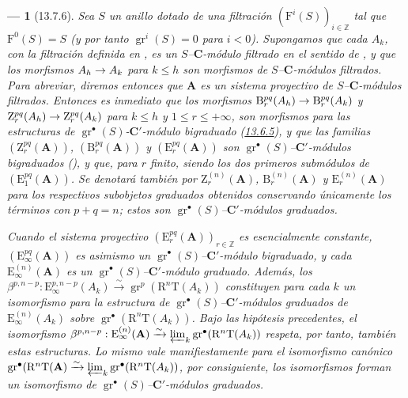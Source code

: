 \documentclass[10pt,oneside,openany]{book}
\theoremstyle{egaenv}\newtheorem*{env}{---}
\theoremstyle{egastatement}
\theoremstyle{egadescription}
\renewcommand{\leq}{\leqslant}
\renewcommand{\to}{\mathchoice{\longrightarrow}{\rightarrow}{\rightarrow}{\rightarrow}}
\begin{document}
\begin{env}[13.7.6]
\label{0.13.7.6}
\label{0.13.7.6-fr}
Sea $S$ un anillo dotado de una filtración
$(\mathrm F^i(S))_{i\in\mathbb Z}$ tal que
$\mathrm F^0(S)=S$ (y por tanto
$\operatorname{gr}^i(S)=0$ para $i<0$).
Supongamos que cada $A_k$, con la filtración definida en
, es un
$S$--$\boldsymbol{C}$-\emph{módulo filtrado} en el sentido de , y que los
morfismos $A_h\to A_k$ para $k\leq h$ son morfismos de
$S$--$\boldsymbol{C}$-módulos filtrados.
Para abreviar, diremos entonces que $\mathbf A$ es un
\emph{sistema proyectivo de $S$--$\boldsymbol{C}$-módulos filtrados}. Entonces es inmediato que los morfismos $\mathrm B_r^{pq}(A_h)\to\mathrm B_r^{pq}(A_k)$ y $\mathrm Z_r^{pq}(A_h)\to\mathrm Z_r^{pq}(A_k)$ para $k\leq h$ y
$1\leq r\leq+\infty$, son morfismos para las estructuras de $\operatorname{gr}^\bullet(S)$-$\boldsymbol{C}'$-\emph{módulo bigraduado} (\hyperref[0.13.6.5-fr]{13.6.5}), y que las familias $(\mathrm Z_r^{pq}(\mathbf A))$, $(\mathrm B_r^{pq}(\mathbf A))$ y $(\mathrm E_r^{pq}(\mathbf A))$ son $\operatorname{gr}^\bullet(S)$--$\boldsymbol{C}'$-\emph{módulos bigraduados}
(), y que, para $r$ finito, siendo los dos primeros submódulos de $(\mathrm E_1^{pq}(\mathbf A))$. Se denotará también por $\mathrm Z_r^{(n)}(\mathbf A)$,
$\mathrm B_r^{(n)}(\mathbf A)$ y
$\mathrm E_r^{(n)}(\mathbf A)$ para los respectivos subobjetos graduados
obtenidos conservando únicamente los términos con $p+q=n$; estos son
$\operatorname{gr}^\bullet(S)$--$\boldsymbol{C}'$-\emph{módulos graduados}.

Cuando el sistema proyectivo
$(\mathrm E_r^{pq}(\mathbf A))_{r\in\mathbb Z}$ es esencialmente constante,
$(\mathrm E_\infty^{pq}(\mathbf A))$ es asimismo un
$\operatorname{gr}^\bullet(S)$--$\boldsymbol{C}'$-módulo bigraduado, y cada
$\mathrm E_\infty^{(n)}(\mathbf A)$ es un
$\operatorname{gr}^\bullet(S)$--$\boldsymbol{C}'$-módulo graduado. Además, los $\beta^{p,n-p}:\mathrm E_\infty^{p,n-p}(A_k)\xrightarrow{\sim}
\operatorname{gr}^p(\mathrm R^n\mathrm T(A_k))$ constituyen para cada $k$ un isomorfismo para la estructura de $\operatorname{gr}^\bullet(S)$--$\boldsymbol{C}'$-módulos graduados de
$\mathrm E_\infty^{(n)}(A_k)$ sobre
$\operatorname{gr}^\bullet(\mathrm R^n\mathrm T(A_k))$.
Bajo las hipótesis precedentes, el isomorfismo
$\beta^{p,n-p}:\mathrm E_\infty^{(n)}(\mathbf A)\xrightarrow{\sim}
\varprojlim_k\operatorname{gr}^\bullet(\mathrm R^n\mathrm T(A_k))$
respeta, por tanto, también estas estructuras.
Lo mismo vale manifiestamente para el isomorfismo canónico
$\operatorname{gr}^\bullet(\mathrm R^n\mathrm T(\mathbf A)
\xrightarrow{\sim}
\varprojlim_k\operatorname{gr}^\bullet(\mathrm R^n\mathrm T(A_k))$,
por consiguiente, los isomorfismos  forman un
isomorfismo de
$\operatorname{gr}^\bullet(S)$--$\boldsymbol{C}'$-\emph{módulos graduados}.
\end{env}
\end{document}
